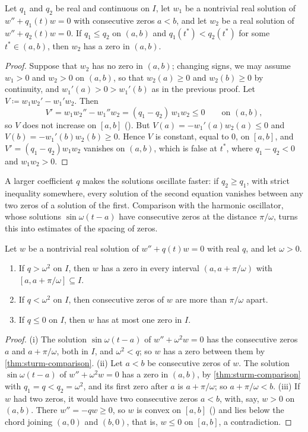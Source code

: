 \begin{theorem}
\label{thm:sturm-comparison}
Let $q_1$ and $q_2$ be real and continuous on $I$, let $w_1$ be a nontrivial real solution of $w''+q_1(t)w=0$ with consecutive zeros $a<b$, and let $w_2$ be a real solution of $w''+q_2(t)w=0$. If $q_1\le q_2$ on $(a,b)$ and $q_1(t^*)<q_2(t^*)$ for some $t^*\in(a,b)$, then $w_2$ has a zero in $(a,b)$.
\end{theorem}

\begin{proof}
Suppose that $w_2$ has no zero in $(a,b)$; changing signs, we may assume $w_1>0$ and $w_2>0$ on $(a,b)$, so that $w_2(a)\ge0$ and $w_2(b)\ge0$ by continuity, and $w_1'(a)>0>w_1'(b)$ as in the previous proof. Let $V\coloneqq w_1w_2'-w_1'w_2$. Then
\[
V'=w_1w_2''-w_1''w_2=(q_1-q_2)\,w_1w_2\le0\qquad\text{on }(a,b),
\]
so $V$ does not increase on $[a,b]$ (). But $V(a)=-w_1'(a)w_2(a)\le0$ and $V(b)=-w_1'(b)w_2(b)\ge0$. Hence $V$ is constant, equal to $0$, on $[a,b]$, and $V'=(q_1-q_2)w_1w_2$ vanishes on $(a,b)$, which is false at $t^*$, where $q_1-q_2<0$ and $w_1w_2>0$.
\end{proof}

A larger coefficient $q$ makes the solutions oscillate faster: if $q_2\ge q_1$, with strict inequality somewhere, every solution of the second equation vanishes between any two zeros of a solution of the first. Comparison with the harmonic oscillator, whose solutions $\sin\omega(t-a)$ have consecutive zeros at the distance $\pi/\omega$, turns this into estimates of the spacing of zeros.

\begin{corollary}
\label{cor:zero-spacing}
Let $w$ be a nontrivial real solution of $w''+q(t)w=0$ with real $q$, and let $\omega>0$.
\begin{enumerate}
\item If $q>\omega^2$ on $I$, then $w$ has a zero in every interval $(a,a+\pi/\omega)$ with $[a,a+\pi/\omega]\subseteq I$.
\item If $q<\omega^2$ on $I$, then consecutive zeros of $w$ are more than $\pi/\omega$ apart.
\item If $q\le0$ on $I$, then $w$ has at most one zero in $I$.
\end{enumerate}
\end{corollary}

\begin{proof}
(i) The solution $\sin\omega(t-a)$ of $w''+\omega^2w=0$ has the consecutive zeros $a$ and $a+\pi/\omega$, both in $I$, and $\omega^2<q$; so $w$ has a zero between them by \cref{thm:sturm-comparison}. (ii) Let $a<b$ be consecutive zeros of $w$. The solution $\sin\omega(t-a)$ of $w''+\omega^2w=0$ has a zero in $(a,b)$, by \cref{thm:sturm-comparison} with $q_1=q<q_2=\omega^2$, and its first zero after $a$ is $a+\pi/\omega$; so $a+\pi/\omega<b$. (iii) If $w$ had two zeros, it would have two consecutive zeros $a<b$, with, say, $w>0$ on $(a,b)$. There $w''=-qw\ge0$, so $w$ is convex on $[a,b]$ () and lies below the chord joining $(a,0)$ and $(b,0)$, that is, $w\le0$ on $[a,b]$, a contradiction.
\end{proof}

